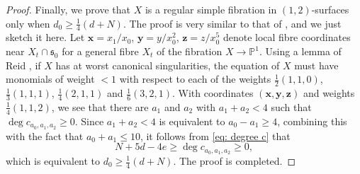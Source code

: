 \documentclass[a4paper,11pt]{amsart}
\newcommand{\PP}{\ensuremath{\mathbb{P}}}
\newcommand{\s}{\ensuremath{\mathfrak{s}}}
\theoremstyle{definition}
\theoremstyle{remark}
\numberwithin{equation}{section}
\begin{document}
\begin{proof}
    Finally, we prove that $X$ is a regular simple fibration in $(1, 2)$-surfaces only when $d_0 \ge \frac{1}{4}(d + N)$. The proof is very similar to that of \cite[Proposition 1.6]{CP}, and we just sketch it here. Let $\mathbf{x} = x_1/x_0$, $\mathbf{y} = y/x_0^2$, $\mathbf{z} = z/x_0^5$ denote local fibre coordinates near $X_t\cap \s_0$ for a general fibre $X_t$ of the fibration $X \to \PP^1$. Using a lemma of Reid \cite[\S 4.6 and \S 4.9]{YPG}, if $X$ has at worst canonical singularities, the equation of $X$ must have monomials of weight $<1$ with respect to each of the weights $\frac12 (1,1,0)$, $\frac13 (1,1,1)$, $\frac14(2,1,1)$ and $\frac16(3,2,1)$.
	With coordinates $(\mathbf{x}, \mathbf{y}, \mathbf{z})$ and weights $\frac14(1,1,2)$, we see that there are $a_1$ and $a_2$ with $a_1 + a_2 < 4$ such that $\deg c_{a_0, a_1, a_2} \ge 0$. Since $a_1 + a_2 < 4$ is equivalent to $a_0 - a_1 \ge 4$, combining this with the fact that $a_0 + a_1 \le 10$, it follows from \eqref{eq: degree c} that 
    $$
	N + 5d - 4e \ge \deg c_{a_0,a_1,a_2} \ge 0,
	$$
	which is equivalent to $d_0 \ge \frac{1}{4}(d + N)$. The proof is completed.
\end{proof}




\end{document}

